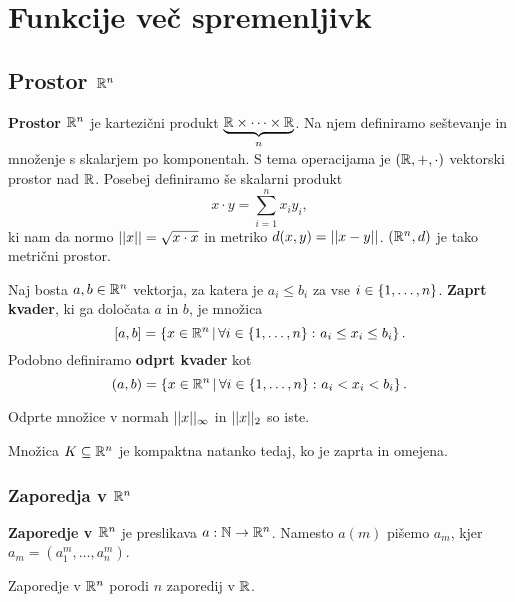 \section{Funkcije več spremenljivk}
\subsection{Prostor $\mathbb{R}^n$}
\begin{definicija}
    \textbf{Prostor $\mathbb{R}^n$} je kartezični produkt
    $\underbrace{\mathbb{R} \times \dots \times \mathbb{R}}_n$. Na njem definiramo
    seštevanje in množenje s skalarjem po komponentah. S tema
    operacijama je $(\mathbb{R},+,\cdot)$ vektorski prostor nad $\mathbb{R}$. Posebej
    definiramo še skalarni produkt
    \[
    x \cdot y = \sum_{i=1}^n x_iy_i,
    \]
    ki nam da normo $||x||=\sqrt{x \cdot x}$ in metriko
    $d(x,y) = ||x-y||$. $(\mathbb{R}^n,d)$ je tako metrični prostor.
    \end{definicija}

\begin{definicija}
    Naj bosta $a,b \in \mathbb{R}^n$ vektorja, za katera je $a_i \leq b_i$ za
    vse $i \in \left\{1,\dots,n\right\}$. \textbf{Zaprt kvader}, ki
    ga določata $a$ in $b$, je množica
    \[
    [a,b] = \left\{x\in\mathbb{R}^n \,|\, \forall i \in \left\{1,\dots,n\right\} \colon
    a_i \leq x_i \leq b_i\right\}.
    \]
    Podobno definiramo \textbf{odprt kvader} kot
    \[
    (a,b) = \left\{x\in\mathbb{R}^n \,|\, \forall i \in \left\{1,\dots,n\right\} \colon
    a_i < x_i < b_i\right\}.
    \]
    \end{definicija}
    
    \begin{opomba}
    Odprte množice v normah $||x||_\infty$ in $||x||_2$ so iste.
    \end{opomba}
    
    \begin{izrek}
    Množica $K\subseteq\mathbb{R}^n$ je kompaktna natanko tedaj, ko je zaprta
    in omejena.
    \end{izrek}

\subsubsection{Zaporedja v $\mathbb{R}^n$}
\begin{definicija}
    \textbf{Zaporedje v $\mathbb{R}^n$} je preslikava $a: \mathbb{N} \to \mathbb{R}^n$. Namesto $a(m)$ pišemo $a_m$, kjer $a_m = (a_1^m, \ldots, a_n^m)$.
\end{definicija}

\begin{opomba}
    Zaporedje v $\mathbb{R}^n$ porodi $n$ zaporedij v $\mathbb{R}$.
\end{opomba}

